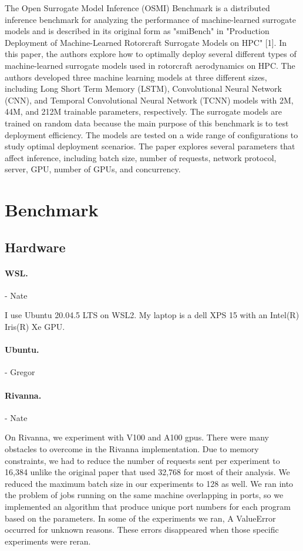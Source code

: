 \documentclass[sigplan,screen,noacm]{acmart}
\begin{document}
The Open Surrogate Model Inference (OSMI) Benchmark is a distributed inference benchmark for analyzing the performance of machine-learned surrogate models and is described in its original form as "smiBench" in "Production Deployment of Machine-Learned Rotorcraft Surrogate Models on HPC" [1]. In this paper, the authors explore how to optimally deploy several different types of machine-learned surrogate models used in rotorcraft aerodynamics on HPC. The authors developed three machine learning models at three different sizes, including Long Short Term Memory (LSTM), Convolutional Neural Network (CNN), and Temporal Convolutional Neural Network (TCNN) models with 2M, 44M, and 212M trainable parameters, respectively. The surrogate models are trained on random data because the main purpose of this benchmark is to test deployment efficiency. The models are tested on a wide range of configurations to study optimal deployment scenarios. The paper explores several parameters that affect inference, including batch size, number of requests, network protocol, server, GPU, number of GPUs, and concurrency.              

\section{Benchmark}

\subsection{Hardware}

\paragraph{WSL.} - Nate

I use Ubuntu 20.04.5 LTS on WSL2. My laptop is a dell XPS 15 with an Intel(R) Iris(R) Xe GPU.

\paragraph{Ubuntu.} - Gregor

\paragraph{Rivanna.} - Nate

On Rivanna, we experiment with V100 and A100 gpus. There were many obstacles to overcome in the Rivanna implementation. Due to memory constraints, we had to reduce the number of requests sent per experiment to 16,384 unlike the original paper that used 32,768 for most of their analysis. We reduced the maximum batch size in our experiments to 128 as well. We ran into the problem of jobs running on the same machine overlapping in ports, so we implemented an algorithm that produce unique port numbers for each program based on the parameters. In some of the experiments we ran, A ValueError occurred for unknown reasons. These errors disappeared when those specific experiments were reran.
\end{document}
